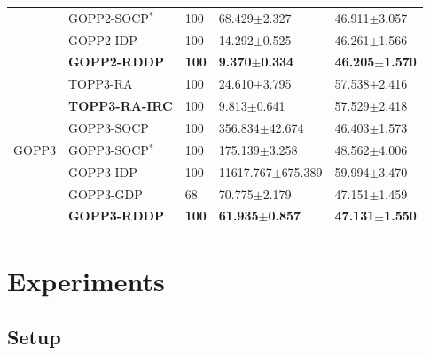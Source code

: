 \documentclass[journal]{IEEEtran}
\theoremstyle{definition}
\theoremstyle{definition}
\begin{document}
\begin{table}[!t]
{{\begin{tabular}{lllll}
        & GOPP2-SOCP${}^*$ & 100 & 68.429$\pm$2.327 & 46.911$\pm$3.057 \\
        & GOPP2-IDP & 100 & 14.292$\pm$0.525 & 46.261$\pm$1.566 \\
        & \textbf{GOPP2-RDDP} & \textbf{100} & \textbf{9.370$\pm$0.334} & \textbf{46.205$\pm$1.570} \\
        \midrule
        \multirow{7}{*}{GOPP3} & TOPP3-RA & 100 & 24.610$\pm$3.795 & 57.538$\pm$2.416 \\
        & \textbf{TOPP3-RA-IRC} & 100 & 9.813$\pm$0.641 & 57.529$\pm$2.418 \\ 
        & GOPP3-SOCP & 100 & 356.834$\pm$42.674 & 46.403$\pm$1.573 \\
        & GOPP3-SOCP${}^*$ & 100 & 175.139$\pm$3.258 & 48.562$\pm$4.006 \\
        & GOPP3-IDP & 100 & 11617.767$\pm$675.389 & 59.994$\pm$3.470 \\
        & GOPP3-GDP & 68 & 70.775$\pm$2.179 & 47.151$\pm$1.459 \\
        & \textbf{GOPP3-RDDP} & \textbf{100} & \textbf{61.935$\pm$0.857} & \textbf{47.131$\pm$1.550} \\ \bottomrule
    \end{tabular}}
    }
\end{table}

\section{Experiments}

\subsection{Setup}
\end{document}
